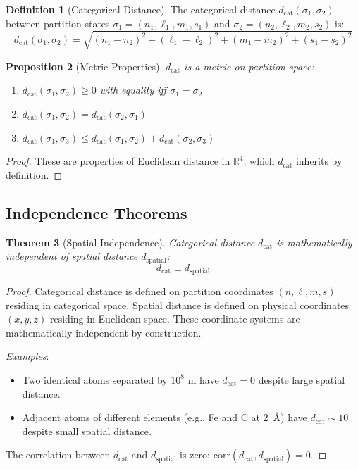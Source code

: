 \documentclass[10pt,twocolumn]{article}
\theoremstyle{plain}
\newtheorem{theorem}{Theorem}[section]
\newtheorem{proposition}[theorem]{Proposition}
\theoremstyle{definition}
\newtheorem{definition}[theorem]{Definition}
\theoremstyle{remark}
\newcommand{\R}{\mathbb{R}}
\newcommand{\dcat}{d_{\mathrm{cat}}}
\begin{document}
\begin{definition}[Categorical Distance]
\label{def:cat_distance}
The categorical distance $\dcat(\sigma_1, \sigma_2)$ between partition states $\sigma_1 = (n_1, \ell_1, m_1, s_1)$ and $\sigma_2 = (n_2, \ell_2, m_2, s_2)$ is:
\begin{equation}
\dcat(\sigma_1, \sigma_2) = \sqrt{(n_1 - n_2)^2 + (\ell_1 - \ell_2)^2 + (m_1 - m_2)^2 + (s_1 - s_2)^2}
\label{eq:cat_distance}
\end{equation}
\end{definition}

\begin{proposition}[Metric Properties]
\label{prop:metric}
$\dcat$ is a metric on partition space:
\begin{enumerate}[label=(\roman*)]
\item $\dcat(\sigma_1, \sigma_2) \geq 0$ with equality iff $\sigma_1 = \sigma_2$
\item $\dcat(\sigma_1, \sigma_2) = \dcat(\sigma_2, \sigma_1)$
\item $\dcat(\sigma_1, \sigma_3) \leq \dcat(\sigma_1, \sigma_2) + \dcat(\sigma_2, \sigma_3)$
\end{enumerate}
\end{proposition}

\begin{proof}
These are properties of Euclidean distance in $\R^4$, which $\dcat$ inherits by definition.
\end{proof}

\subsection{Independence Theorems}

\begin{theorem}[Spatial Independence]
\label{thm:spatial_independence}
Categorical distance $\dcat$ is mathematically independent of spatial distance $d_{\mathrm{spatial}}$:
\begin{equation}
\dcat \perp d_{\mathrm{spatial}}
\label{eq:spatial_indep}
\end{equation}
\end{theorem}

\begin{proof}
Categorical distance is defined on partition coordinates $(n, \ell, m, s)$ residing in categorical space. Spatial distance is defined on physical coordinates $(x, y, z)$ residing in Euclidean space. These coordinate systems are mathematically independent by construction.

\emph{Examples}:
\begin{itemize}
\item Two identical atoms separated by $10^8$ m have $\dcat = 0$ despite large spatial distance.
\item Adjacent atoms of different elements (e.g., Fe and C at 2~\AA) have $\dcat \sim 10$ despite small spatial distance.
\end{itemize}
The correlation between $\dcat$ and $d_{\mathrm{spatial}}$ is zero: $\mathrm{corr}(\dcat, d_{\mathrm{spatial}}) = 0$.
\end{proof}
\end{document}
